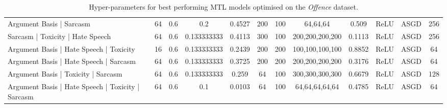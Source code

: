 \begin{landscape}
\begin{table}[]
{\begin{tabular}{l|ccccccccccc}
      Argument Basis | Sarcasm                          & 64         & 0.6              & 0.2              & 0.4527  & 200           & 100    & 64,64,64        & 0.509         & ReLU          & ASGD      & 256        \\
      Sarcasm | Toxicity | Hate Speech                  & 64         & 0.6              & 0.133333333      & 0.4113  & 300           & 100    & 200,200,200,200 & 0.1113        & ReLU          & ASGD      & 256        \\
      Argument Basis | Hate Speech | Toxicity           & 16         & 0.6              & 0.133333333      & 0.2439  & 200           & 200    & 100,100,100,100 & 0.8852        & ReLU          & ASGD      & 64         \\
      Argument Basis | Hate Speech | Sarcasm            & 64         & 0.6              & 0.133333333      & 0.3725  & 200           & 200    & 200,200,200,200 & 0.3176        & ReLU          & ASGD      & 64         \\
      Argument Basis | Toxicity | Sarcasm               & 64         & 0.6              & 0.133333333      & 0.259   & 64            & 100    & 300,300,300,300 & 0.6679        & ReLU          & ASGD      & 128        \\
      Argument Basis | Hate Speech | Toxicity | Sarcasm & 64         & 0.6              & 0.1              & 0.0103  & 64            & 100    & 64,64,64,64,64  & 0.4785        & ReLU          & ASGD      & 64
    \end{tabular}%
    }
    \caption{Hyper-parameters for best performing MTL models optimised on the \textit{Offence} dataset.}
    \label{tab:mtl_params_davidson}
  \end{table}
  \vfill  
  \begin{table}[]
    \centering
\end{table}
\end{landscape}
